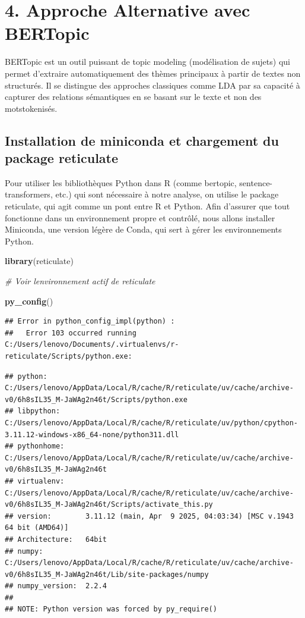 \documentclass[
]{article}
\newenvironment{Shaded}{\begin{snugshade}}{\end{snugshade}}
\newcommand{\CommentTok}[1]{\textcolor[rgb]{0.56,0.35,0.01}{\textit{#1}}}
\newcommand{\FunctionTok}[1]{\textcolor[rgb]{0.13,0.29,0.53}{\textbf{#1}}}
\newcommand{\NormalTok}[1]{#1}
\begin{document}
\section{4. Approche Alternative avec BERTopic}\label{sec:importation}

BERTopic est un outil puissant de topic modeling (modélisation de
sujets) qui permet d'extraire automatiquement des thèmes principaux à
partir de textes non structurés. Il se distingue des approches
classiques comme LDA par sa capacité à capturer des relations
sémantiques en se basant sur le texte et non des motstokenisés.

\subsection{Installation de miniconda et chargement du package
reticulate}\label{installation-de-miniconda-et-chargement-du-package-reticulate}

Pour utiliser les bibliothèques Python dans R (comme bertopic,
sentence-transformers, etc.) qui sont nécessaire à notre analyse, on
utilise le package reticulate, qui agit comme un pont entre R et Python.
Afin d'assurer que tout fonctionne dans un environnement propre et
contrôlé, nous allons installer Miniconda, une version légère de Conda,
qui sert à gérer les environnements Python.

\begin{Shaded}
\begin{Highlighting}[]
\FunctionTok{library}\NormalTok{(reticulate)}

\CommentTok{\# Voir l\textquotesingle{}environnement actif de reticulate}

\FunctionTok{py\_config}\NormalTok{()}
\end{Highlighting}
\end{Shaded}

\begin{verbatim}
## Error in python_config_impl(python) : 
##   Error 103 occurred running C:/Users/lenovo/Documents/.virtualenvs/r-reticulate/Scripts/python.exe:
\end{verbatim}

\begin{verbatim}
## python:         C:/Users/lenovo/AppData/Local/R/cache/R/reticulate/uv/cache/archive-v0/6h8sIL35_M-JaWAg2n46t/Scripts/python.exe
## libpython:      C:/Users/lenovo/AppData/Local/R/cache/R/reticulate/uv/python/cpython-3.11.12-windows-x86_64-none/python311.dll
## pythonhome:     C:/Users/lenovo/AppData/Local/R/cache/R/reticulate/uv/cache/archive-v0/6h8sIL35_M-JaWAg2n46t
## virtualenv:     C:/Users/lenovo/AppData/Local/R/cache/R/reticulate/uv/cache/archive-v0/6h8sIL35_M-JaWAg2n46t/Scripts/activate_this.py
## version:        3.11.12 (main, Apr  9 2025, 04:03:34) [MSC v.1943 64 bit (AMD64)]
## Architecture:   64bit
## numpy:          C:/Users/lenovo/AppData/Local/R/cache/R/reticulate/uv/cache/archive-v0/6h8sIL35_M-JaWAg2n46t/Lib/site-packages/numpy
## numpy_version:  2.2.4
## 
## NOTE: Python version was forced by py_require()
\end{verbatim}
\end{document}
